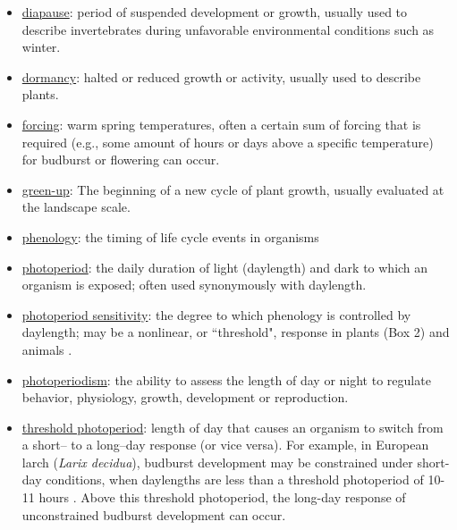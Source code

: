 \documentclass{article}
\begin{document}
\begin{itemize}
\item \underline{diapause}: period of suspended development or growth, usually used to describe invertebrates during unfavorable environmental conditions such as winter.
\item \underline{dormancy}: halted or reduced growth or activity, usually used to describe plants.
\item \underline{forcing}: warm spring temperatures, often a certain sum of forcing that is required (e.g., some amount of hours or days above a specific temperature) for budburst or flowering can occur.
\item \underline{green-up}: The beginning of a new cycle of plant growth, usually evaluated at the landscape scale.
\item \underline{phenology}: the timing of life cycle events in organisms
\item \underline{photoperiod}: the daily duration of light (daylength) and dark to which an organism is exposed; often used synonymously with daylength.
\item \underline{photoperiod sensitivity}: the degree to which phenology is controlled by daylength; may be a nonlinear, or ``threshold", response in plants (Box 2) and animals \citep{grevstad2015,tobin2008}.
\item \underline{photoperiodism}: the ability to assess the length of day or night to regulate behavior, physiology, growth, development or reproduction.
\item \underline{threshold photoperiod}: length of day that causes an organism to switch from a short-- to a long--day response (or vice versa). For example, in European larch (\emph{Larix decidua}), budburst development may be constrained under short-day conditions, when daylengths are less than a threshold photoperiod of 10-11 hours \citep{migliavacca2008}. Above this threshold photoperiod, the long-day response of unconstrained budburst development can occur.
\end{itemize}
\end{document}
